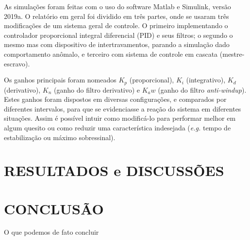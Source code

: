 \documentclass[a4paper,12pt]{article}
\begin{document}
As simulações foram feitas com o uso do software Matlab e Simulink, versão 2019a. O relatório em geral foi dividido em três partes, onde se usaram três modificações de um sistema geral de controle. O primeiro implementando o controlador proporcional integral diferencial (PID) e seus filtros; o segundo o mesmo mas com dispositivo de intertravamentos, parando a simulação dado comportamento anômalo, e terceiro com sistema de controle em cascata (mestre-escravo).

Os ganhos principais foram nomeados $K_p$ (proporcional), $K_i$ (integrativo), $K_d$ (derivativo), $K_n$ (ganho do filtro derivativo) e $K_aw$ (ganho do filtro \emph{anti-windup}). Estes ganhos foram dispostos em diversas configurações, e comparados por diferentes intervalos, para que se evidenciasse a reação do sistema em diferentes situações. Assim é possível intuir como modificá-lo para performar melhor em algum quesito ou como reduzir uma característica indesejada (\emph{e.g.} tempo de estabilização ou máximo sobressinal).

\newpage



\thispagestyle{main}

\section{RESULTADOS e DISCUSSÕES}\hspace{4ex}






\thispagestyle{main}

\section{CONCLUSÃO}\hspace{4ex}
O que podemos de fato concluir

\newpage




{}


\appendix


\end{document}
